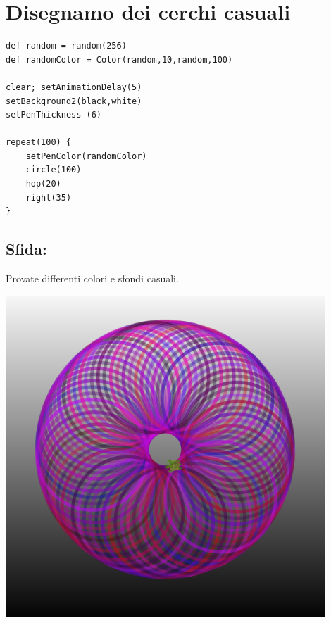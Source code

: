 \chapter{Disegnamo dei cerchi casuali}
\begin{multicols}{2}

\begin{lstlisting}[basicstyle={\ttfamily\fontsize{16}{19}\selectfont},numbers=none]
def random = random(256)
def randomColor = Color(random,10,random,100) 

clear; setAnimationDelay(5)
setBackground2(black,white)
setPenThickness (6)

repeat(100) {
    setPenColor(randomColor)
    circle(100)
    hop(20)
    right(35)
}
\end{lstlisting}
        
\section*{\color{BrickRed}Sfida:}
Provate differenti colori e sfondi casuali.


\columnbreak


\begin{center}
\includegraphics[width=12.0cm]{../img/circle-of-circles.png}
\end{center}

\end{multicols}

